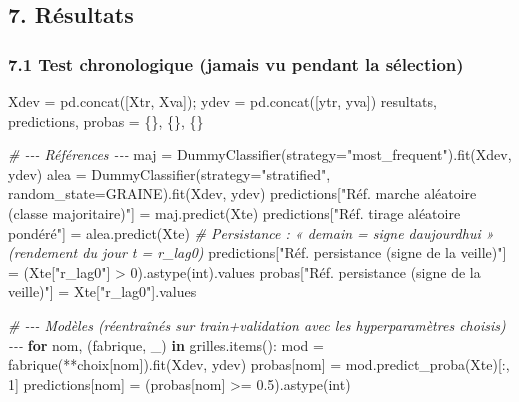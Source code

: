 \documentclass[
  10pt,
]{article}
\newenvironment{Shaded}{}{}
\newcommand{\BuiltInTok}[1]{\textcolor[rgb]{0.00,0.50,0.00}{#1}}
\newcommand{\CommentTok}[1]{\textcolor[rgb]{0.38,0.63,0.69}{\textit{#1}}}
\newcommand{\ControlFlowTok}[1]{\textcolor[rgb]{0.00,0.44,0.13}{\textbf{#1}}}
\newcommand{\DecValTok}[1]{\textcolor[rgb]{0.25,0.63,0.44}{#1}}
\newcommand{\FloatTok}[1]{\textcolor[rgb]{0.25,0.63,0.44}{#1}}
\newcommand{\KeywordTok}[1]{\textcolor[rgb]{0.00,0.44,0.13}{\textbf{#1}}}
\newcommand{\NormalTok}[1]{#1}
\newcommand{\OperatorTok}[1]{\textcolor[rgb]{0.40,0.40,0.40}{#1}}
\newcommand{\StringTok}[1]{\textcolor[rgb]{0.25,0.44,0.63}{#1}}
\begin{document}
\hypertarget{ruxe9sultats}{%
\subsection{7. Résultats}\label{ruxe9sultats}}

\hypertarget{test-chronologique-jamais-vu-pendant-la-suxe9lection}{%
\subsubsection{7.1 Test chronologique (jamais vu pendant la
sélection)}\label{test-chronologique-jamais-vu-pendant-la-suxe9lection}}

\begin{Shaded}
\begin{Highlighting}[]
\NormalTok{Xdev }\OperatorTok{=}\NormalTok{ pd.concat([Xtr, Xva])}\OperatorTok{;}\NormalTok{ ydev }\OperatorTok{=}\NormalTok{ pd.concat([ytr, yva])}
\NormalTok{resultats, predictions, probas }\OperatorTok{=}\NormalTok{ \{\}, \{\}, \{\}}

\CommentTok{\# {-}{-}{-} Références {-}{-}{-}}
\NormalTok{maj }\OperatorTok{=}\NormalTok{ DummyClassifier(strategy}\OperatorTok{=}\StringTok{"most\_frequent"}\NormalTok{).fit(Xdev, ydev)}
\NormalTok{alea }\OperatorTok{=}\NormalTok{ DummyClassifier(strategy}\OperatorTok{=}\StringTok{"stratified"}\NormalTok{, random\_state}\OperatorTok{=}\NormalTok{GRAINE).fit(Xdev, ydev)}
\NormalTok{predictions[}\StringTok{"Réf. marche aléatoire (classe majoritaire)"}\NormalTok{] }\OperatorTok{=}\NormalTok{ maj.predict(Xte)}
\NormalTok{predictions[}\StringTok{"Réf. tirage aléatoire pondéré"}\NormalTok{] }\OperatorTok{=}\NormalTok{ alea.predict(Xte)}
\CommentTok{\# Persistance : « demain = signe d\textquotesingle{}aujourd\textquotesingle{}hui » (rendement du jour t = r\_lag0)}
\NormalTok{predictions[}\StringTok{"Réf. persistance (signe de la veille)"}\NormalTok{] }\OperatorTok{=}\NormalTok{ (Xte[}\StringTok{"r\_lag0"}\NormalTok{] }\OperatorTok{\textgreater{}} \DecValTok{0}\NormalTok{).astype(}\BuiltInTok{int}\NormalTok{).values}
\NormalTok{probas[}\StringTok{"Réf. persistance (signe de la veille)"}\NormalTok{] }\OperatorTok{=}\NormalTok{ Xte[}\StringTok{"r\_lag0"}\NormalTok{].values}

\CommentTok{\# {-}{-}{-} Modèles (réentraînés sur train+validation avec les hyperparamètres choisis) {-}{-}{-}}
\ControlFlowTok{for}\NormalTok{ nom, (fabrique, \_) }\KeywordTok{in}\NormalTok{ grilles.items():}
\NormalTok{    mod }\OperatorTok{=}\NormalTok{ fabrique(}\OperatorTok{**}\NormalTok{choix[nom]).fit(Xdev, ydev)}
\NormalTok{    probas[nom] }\OperatorTok{=}\NormalTok{ mod.predict\_proba(Xte)[:, }\DecValTok{1}\NormalTok{]}
\NormalTok{    predictions[nom] }\OperatorTok{=}\NormalTok{ (probas[nom] }\OperatorTok{\textgreater{}=} \FloatTok{0.5}\NormalTok{).astype(}\BuiltInTok{int}\NormalTok{)}


\end{Highlighting}
\end{Shaded}
\end{document}
